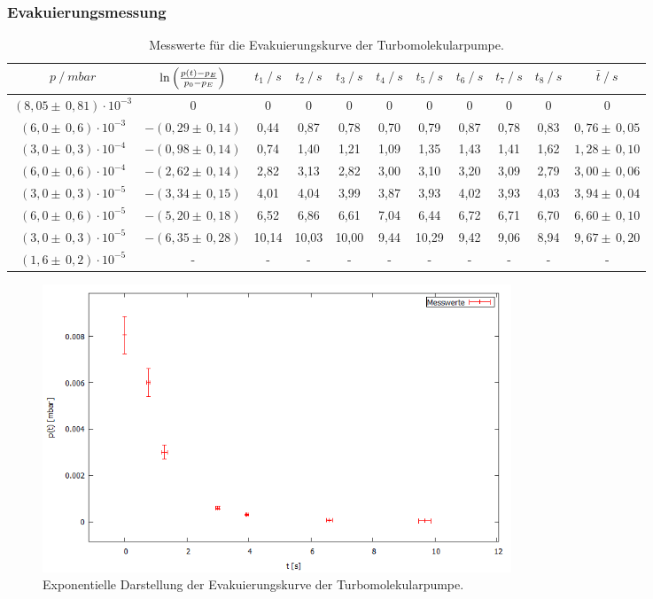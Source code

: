 \subsubsection{Evakuierungsmessung}
\begin{table}[H]
\tiny
\centering
\begin{tabular}{c|c|c|c|c|c|c|c|c|c|c}
{$p \:/\: \si{mbar}$} & {$\ln{\Bigl( \frac{p(t)-p_E}{p_0-p_E}\Bigr)}$} & {$t_1 \:/\: \si{s} $} & {$t_2 \:/\: \si{s}$} & {$t_3 \:/\: \si{s}$} & {$t_4 \:/\: \si{s}$} & {$t_5 \:/\: \si{s}$} & {$t_6 \:/\: \si{s}$}& {$t_7 \:/\: \si{s}$} & {$t_8 \:/\: \si{s}$} & {$\bar{t} \:/\: \si{s}$}\\
\midrule
$(8,05 \pm \, 0,81)\cdot 10^{-3}$ & 0 & 0 &  0 & 0 & 0 & 0 & 0 & 0 & 0 & 0\\
$(6,0 \pm \, 0,6)\cdot 10^{-3}$ & $-(0,29 \pm \, 0,14)$ & 0,44 & 0,87 & 0,78 & 0,70 & 0,79 & 0,87 & 0,78 & 0,83 & $0,76 \pm \, 0,05$\\
$(3,0 \pm \, 0,3)\cdot 10^{-4}$ & $-(0,98 \pm \, 0,14)$ & 0,74 & 1,40 & 1,21 & 1,09 & 1,35 & 1,43 & 1,41 & 1,62 & $1,28 \pm \, 0,10$\\
$(6,0 \pm \, 0,6)\cdot 10^{-4}$ & $-(2,62 \pm \, 0,14)$ & 2,82 & 3,13 & 2,82 & 3,00 & 3,10 & 3,20 & 3,09 & 2,79 & $3,00 \pm \, 0,06$\\
$(3,0 \pm \, 0,3)\cdot 10^{-5}$ & $-(3,34 \pm \, 0,15)$ & 4,01 & 4,04 & 3,99 & 3,87 & 3,93 & 4,02 & 3,93 & 4,03 & $3,94 \pm \, 0,04$\\
$(6,0 \pm \, 0,6)\cdot 10^{-5}$ & $-(5,20 \pm \, 0,18)$ & 6,52 & 6,86 & 6,61 & 7,04 & 6,44 & 6,72 & 6,71 & 6,70 & $6,60 \pm \, 0,10$\\
$(3,0 \pm \, 0,3)\cdot 10^{-5}$ & $-(6,35 \pm \, 0,28)$ & 10,14 & 10,03 & 10,00 & 9,44 & 10,29 & 9,42 & 9,06 & 8,94 & $9,67 \pm \, 0,20$\\
$(1,6 \pm \, 0,2)\cdot 10^{-5}$ & - & - &  -& -& -& -& -& -& -& - \\
\end{tabular}
\caption{Messwerte für die Evakuierungskurve der Turbomolekularpumpe.}
\label{tab:EvakuierungskurveTurbo}
\end{table}

\begin{figure}[H]
  \centering
  \includegraphics[width=14cm]{bilder/the final final plot.png}
  \caption{Exponentielle Darstellung der Evakuierungskurve der Turbomolekularpumpe.}
  \label{turboexponential}
\end{figure}


